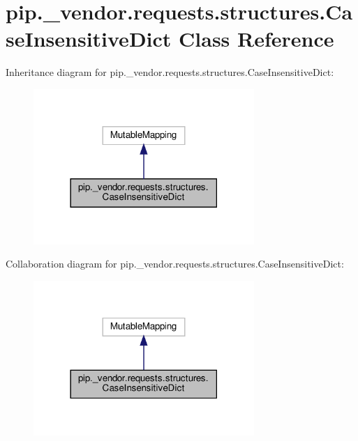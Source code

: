\hypertarget{classpip_1_1__vendor_1_1requests_1_1structures_1_1CaseInsensitiveDict}{}\section{pip.\+\_\+vendor.\+requests.\+structures.\+Case\+Insensitive\+Dict Class Reference}
\label{classpip_1_1__vendor_1_1requests_1_1structures_1_1CaseInsensitiveDict}


Inheritance diagram for pip.\+\_\+vendor.\+requests.\+structures.\+Case\+Insensitive\+Dict\+:
\nopagebreak
\begin{figure}[H]
\begin{center}
\leavevmode
\includegraphics[width=237pt]{classpip_1_1__vendor_1_1requests_1_1structures_1_1CaseInsensitiveDict__inherit__graph}
\end{center}
\end{figure}


Collaboration diagram for pip.\+\_\+vendor.\+requests.\+structures.\+Case\+Insensitive\+Dict\+:
\nopagebreak
\begin{figure}[H]
\begin{center}
\leavevmode
\includegraphics[width=237pt]{classpip_1_1__vendor_1_1requests_1_1structures_1_1CaseInsensitiveDict__coll__graph}
\end{center}
\end{figure}
